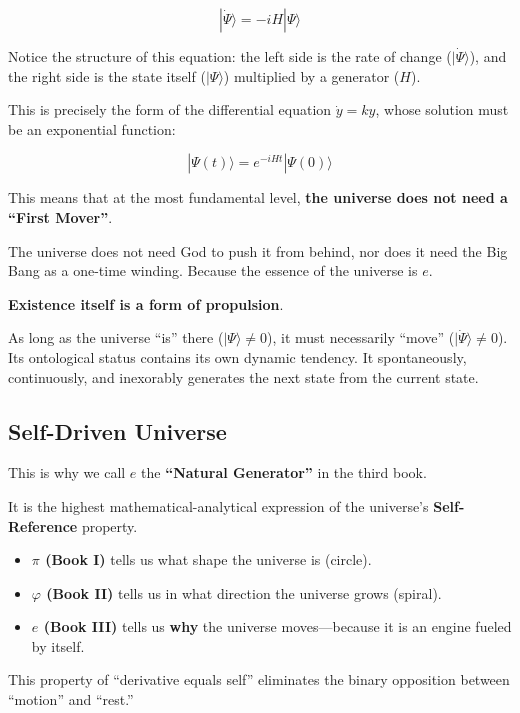 \documentclass[11pt,a4paper,twoside]{book}
\begin{document}
$$|\dot{\Psi}\rangle = -iH |\Psi\rangle$$

Notice the structure of this equation: the left side is the rate of change ($|\dot{\Psi}\rangle$), and the right side is the state itself ($|\Psi\rangle$) multiplied by a generator ($H$).

This is precisely the form of the differential equation $\dot{y} = ky$, whose solution must be an exponential function:

$$|\Psi(t)\rangle = e^{-iHt} |\Psi(0)\rangle$$

This means that at the most fundamental level, \textbf{the universe does not need a ``First Mover''}.

The universe does not need God to push it from behind, nor does it need the Big Bang as a one-time winding. Because the essence of the universe is \textbf{$e$}.

\textbf{Existence itself is a form of propulsion}.

As long as the universe ``is'' there ($|\Psi\rangle \neq 0$), it must necessarily ``move'' ($|\dot{\Psi}\rangle \neq 0$). Its ontological status contains its own dynamic tendency. It spontaneously, continuously, and inexorably generates the next state from the current state.

\subsection{Self-Driven Universe}

This is why we call $e$ the \textbf{``Natural Generator''} in the third book.

It is the highest mathematical-analytical expression of the universe's \textbf{Self-Reference} property.

\begin{itemize}
\item \textbf{$\pi$ (Book I)} tells us what shape the universe is (circle).

\item \textbf{$\varphi$ (Book II)} tells us in what direction the universe grows (spiral).

\item \textbf{$e$ (Book III)} tells us \textbf{why} the universe moves---because it is an engine fueled by itself.
\end{itemize}

This property of ``derivative equals self'' eliminates the binary opposition between ``motion'' and ``rest.''
\end{document}

